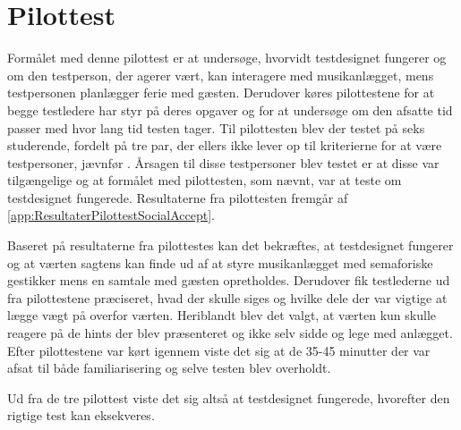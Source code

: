 \section{Pilottest}
\label{PilottestSocialAccept}
%
Formålet med denne pilottest er at undersøge, hvorvidt testdesignet fungerer og om den testperson, der agerer vært, kan interagere med musikanlægget, mens testpersonen planlægger ferie med gæsten. Derudover køres pilottestene for at begge testledere har styr på deres opgaver og for at undersøge om den afsatte tid passer med hvor lang tid testen tager. 
%
Til pilottesten blev der testet på seks studerende, fordelt på tre par, der ellers ikke lever op til kriterierne for at være testpersoner, jævnfør . Årsagen til disse testpersoner blev testet er at disse var tilgængelige og at formålet med pilottesten, som nævnt, var at teste om testdesignet fungerede. Resultaterne fra pilottesten fremgår af \autoref{app:ResultaterPilottestSocialAccept}. 

Baseret på resultaterne fra pilottestes kan det bekræftes, at testdesignet fungerer og at værten sagtens kan finde ud af at styre musikanlægget med semaforiske gestikker mens en samtale med gæsten opretholdes. Derudover fik testlederne ud fra pilottestene præciseret, hvad der skulle siges og hvilke dele der var vigtige at lægge vægt på overfor værten. Heriblandt blev det valgt, at værten kun skulle reagere på de hints der blev præsenteret og ikke selv sidde og lege med anlægget. Efter pilottestene var kørt igennem viste det sig at de 35-45 minutter der var afsat til både familiarisering og selve testen blev overholdt. 

Ud fra de tre pilottest viste det sig altså at testdesignet fungerede, hvorefter den rigtige test kan eksekveres. 

